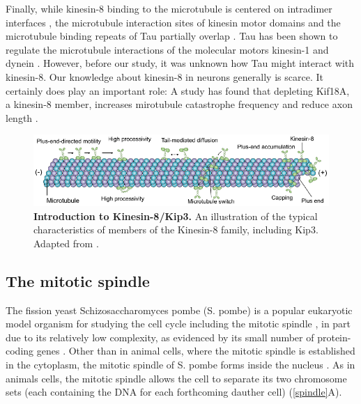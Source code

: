 Finally, while kinesin-8 binding to the microtubule is centered on intradimer interfaces , the microtubule interaction sites of kinesin motor domains and the microtubule binding repeats of Tau partially overlap \parencite{Kellogg2018}. Tau has been shown to regulate the microtubule interactions of the molecular motors kinesin-1 and dynein \parencite{Chaudhary2018,Dixit2008,ebneth1998overexpression,seitz2002single,trinczek1999tau,vershinin2007multiple}. However, before our study, it was unknown how Tau might interact with kinesin-8. Our knowledge about kinesin-8 in neurons generally is scarce. It certainly does play an important role: A study has found that depleting Kif18A, a kinesin-8 member, increases mirotubule catastrophe frequency and reduce axon length \parencite{KEVENAAR2016849}.

\begin{figure}[h!tb]
\centering
\includegraphics[width=\linewidth]{Figures/kip3.png}
\caption[Introduction to Kinesin-8/Kip3.]{\textbf{Introduction to Kinesin-8/Kip3.}
An illustration of the typical characteristics of members of the Kinesin-8 family, including Kip3. Adapted from \cite{Lin2020}.
	}\label{kip3}
\end{figure}

\subsection{The mitotic spindle}
\label{sec:spindle}
The fission yeast Schizosaccharomyces pombe (S. pombe) is a popular eukaryotic model organism for studying the cell cycle including the mitotic spindle \parencite{Vyas2021, Uzsoy2021}, in part due to its relatively low complexity, as evidenced by its small number of protein-coding genes \parencite{Wood2002}. Other than in animal cells, where the mitotic spindle is established in the cytoplasm, the mitotic spindle of S. pombe forms inside the nucleus \parencite{Kilmartin2014}. As in animals cells, the mitotic spindle allows the cell to separate its two chromosome sets (each containing the DNA for each forthcoming dauther cell) (\autoref{spindle}A).

